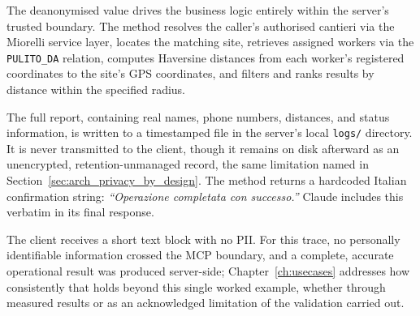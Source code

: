 The deanonymised value drives the business logic entirely within the server's trusted boundary. The method resolves the caller's authorised cantieri via the Miorelli service layer, locates the matching site, retrieves assigned workers via the \texttt{PULITO\_DA} relation, computes Haversine distances from each worker's registered coordinates to the site's GPS coordinates, and filters and ranks results by distance within the specified radius.

The full report, containing real names, phone numbers, distances, and status information, is written to a timestamped file in the server's local \texttt{logs/} directory. It is never transmitted to the client, though it remains on disk afterward as an unencrypted, retention-unmanaged record, the same limitation named in Section~\ref{sec:arch_privacy_by_design}. The method returns a hardcoded Italian confirmation string: \emph{``Operazione completata con successo.''} Claude includes this verbatim in its final response.

The client receives a short text block with no PII. For this trace, no personally identifiable information crossed the MCP boundary, and a complete, accurate operational result was produced server-side; Chapter~\ref{ch:usecases} addresses how consistently that holds beyond this single worked example, whether through measured results or as an acknowledged limitation of the validation carried out.
